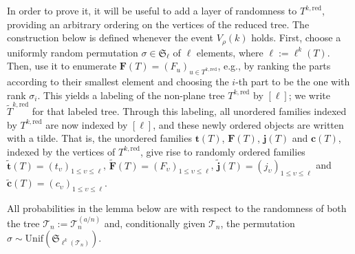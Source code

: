 \documentclass{article}
\theoremstyle{remark}
\newcommand{\cT}{\mathcal{T}}
\newcommand{\fS}{\mathfrak{S}}
\newcommand{\bc}{\mathbf{c}}
\newcommand{\bj}{\mathbf{j}}
\newcommand{\Unif}[1]{\mathrm{Unif}{\left(#1\right)}}
\newcommand{\red}{\mathrm{red}}
\begin{document}
In order to prove it, it will be useful to add a layer of randomness to $T^{k,\red}$, providing an arbitrary ordering on the vertices of the reduced tree.
The construction below is defined whenever the event $V_\rho(k)$ holds.
First, choose a uniformly random permutation $\sigma \in \fS_\ell$ of $\ell$ elements, where $\ell := \ell^k(T)$.
Then, use it to enumerate $\mathbf{F}(T) = (F_u)_{u\in T^{k,\red}}$, e.g., by ranking the parts according to their smallest element and choosing the $i$-th part to be the one with rank $\sigma_i$.
This yields a labeling of the non-plane tree $T^{k,\red}$ by $[\ell]$; we write $\widetilde T^{k,\red}$ for that labeled tree.
Through this labeling, all unordered families indexed by $T^{k,\red}$ are now indexed by $[\ell]$, and these newly ordered objects are written with a tilde.
That is, the unordered families $\mathbf{t}(T)$, $\mathbf{F}(T)$, $\bj(T)$ and $\bc(T)$, indexed by the vertices of $T^{k,\red}$, give rise to randomly ordered families $\widetilde{\mathbf{t}}(T) = (t_\upsilon)_{1\le \upsilon\le \ell}$, $\widetilde{\mathbf{F}}(T) = (F_\upsilon)_{1\le \upsilon\le \ell}$, $\widetilde{\bj}(T) = (j_\upsilon)_{1\le \upsilon\le \ell}$ and $\widetilde{\bc}(T) = (c_\upsilon)_{1\le \upsilon\le \ell}$.

All probabilities in the lemma below are with respect to the randomness of both the tree $\cT_n := \cT_n^{(a/n)}$ and, conditionally given $\cT_n$, the permutation $\sigma \sim \Unif{\fS_{\ell^k(\cT_n)}}$.
\end{document}
